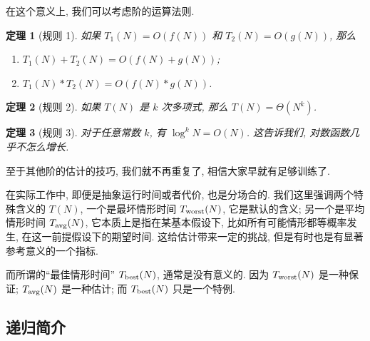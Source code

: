 \documentclass[a4paper]{ctexart}
\newtheorem{theorem}{定理}
\theoremstyle{definition}
\theoremstyle{definition}
\begin{document}
在这个意义上, 我们可以考虑阶的运算法则.

\begin{theorem}[规则 1]
  如果 $T_1(N) = O(f(N))$ 和 $T_2(N) = O(g(N))$, 那么
\begin{enumerate}
\item $T_1(N) + T_2(N) = O(f(N) + g(N))$;
\item $T_1(N) * T_2(N) = O(f(N) * g(N))$.
\end{enumerate}
\end{theorem}

\begin{theorem}[规则 2]
如果 $T(N)$ 是 $k$ 次多项式, 那么 $T(N) = \Theta(N^k)$.  
\end{theorem}

\begin{theorem}[规则 3]
对于任意常数 $k$, 有 $\log^k N = O(N)$.
这告诉我们, 对数函数几乎不怎么增长.
\end{theorem}

至于其他阶的估计的技巧, 我们就不再重复了, 相信大家早就有足够训练了.

在实际工作中, 即便是抽象运行时间或者代价, 也是分场合的. 我们这里强调两个特殊含义的 $T(N)$,
一个是最坏情形时间 $T_{\rm worst} (N)$, 它是默认的含义;
另一个是平均情形时间 $T_{\rm avg}(N)$, 它本质上是指在某基本假设下,
比如所有可能情形都等概率发生, 在这一前提假设下的期望时间. 这给估计带来一定的挑战,
但是有时也是有显著参考意义的一个指标.

而所谓的``最佳情形时间'' $T_{\rm best}(N)$, 通常是没有意义的.
因为 $T_{\rm worst} (N)$ 是一种保证; $T_{\rm avg} (N)$ 是一种估计; 而
$T_{\rm best}(N)$ 只是一个特例.

\subsection{递归简介}
\end{document}

